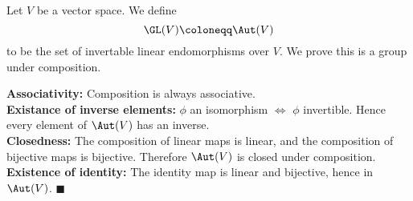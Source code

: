 \begin{defi}
	Let $V$ be a vector space. We define
	$$\GL(V) \coloneqq \Aut(V)$$
	to be the set of invertable linear endomorphisms over $V$. We prove this is a group under composition.\label{1}
\end{defi}

\begin{proo*}
	\textbf{Associativity:} Composition is always associative.\\
	\textbf{Existance of inverse elements:} $\phi$ an isomorphism $\iff$ $\phi$ invertible. Hence every element of $\Aut(V)$ has an inverse.\\
	\textbf{Closedness:} The composition of linear maps is linear, and the composition of bijective maps is bijective. Therefore $\Aut(V)$ is closed under composition.\\
	\textbf{Existence of identity:} The identity map is linear and bijective, hence in $\Aut(V)$. $\blacksquare$
\end{proo*}

